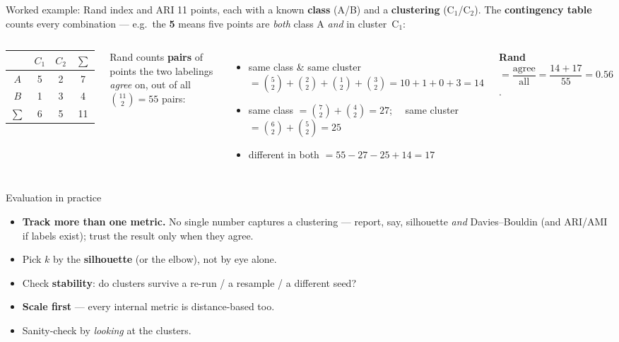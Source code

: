 \documentclass[aspectratio=169]{beamer}
\begin{document}
\begin{frame}{Worked example: Rand index and ARI}
  11 points, each with a known \textbf{class} (A/B) and a \textbf{clustering} (C$_1$/C$_2$). The
  \textbf{contingency table} counts every combination --- e.g.\ the \textbf{5} means five points are
  \emph{both} class A \emph{and} in cluster~C$_1$:
  \begin{columns}[T]
    \begin{center}\small
      \renewcommand{\arraystretch}{1.25}
      \begin{tabular}{c|cc|c}
        & $C_1$ & $C_2$ & $\sum$ \\ \hline
        $A$ & 5 & 2 & 7 \\
        $B$ & 1 & 3 & 4 \\ \hline
        $\sum$ & 6 & 5 & 11 \\
      \end{tabular}
    \end{center}
    \scriptsize
    Rand counts \textbf{pairs} of points the two labelings \emph{agree} on, out of all
    $\binom{11}{2}=55$ pairs:
    \begin{itemize}\scriptsize
      \item same class \& same cluster $=\binom52{+}\binom22{+}\binom12{+}\binom32 = 10{+}1{+}0{+}3 = 14$
      \item same class $=\binom72{+}\binom42=27$; \ \ same cluster $=\binom62{+}\binom52=25$
      \item different in both $=55-27-25+14=17$
    \end{itemize}
    \textbf{Rand} $=\dfrac{\text{agree}}{\text{all}}=\dfrac{14+17}{55}=\mathbf{0.56}$.
  \end{columns}
  \vskip 3pt
\end{frame}

\begin{frame}{Evaluation in practice}
  \begin{itemize}\small
    \item \textbf{Track more than one metric.} No single number captures a clustering --- report,
      say, silhouette \emph{and} Davies--Bouldin (and ARI/AMI if labels exist); trust the result
      only when they agree.
    \item Pick $k$ by the \textbf{silhouette} (or the elbow), not by eye alone.
    \item Check \textbf{stability}: do clusters survive a re-run / a resample / a different seed?
    \item \textbf{Scale first} --- every internal metric is distance-based too.
    \item Sanity-check by \emph{looking} at the clusters.
  \end{itemize}
\end{frame}
\end{document}
